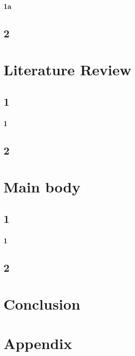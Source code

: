 \documentclass[a4paper,12pt]{report}
\numberwithin{equation}{section}
\begin{document}
\subsubsection{1a}

\section{2}
\chapter{Literature Review}
\minitoc
\section{1}
\subsubsection{1}
\section{2}
\chapter{Main body}
\minitoc
\section{1}
\subsubsection{1}
\section{2}




\chapter{Conclusion}\label{c6}
\minitoc

 
\label{Lastpage}
\clearpage
{}
\appendix


\chapter{Appendix}\label{A1}

\clearpage

%
%
\printbibliography
\printindex
\label{Lastpage1}
\end{document}
